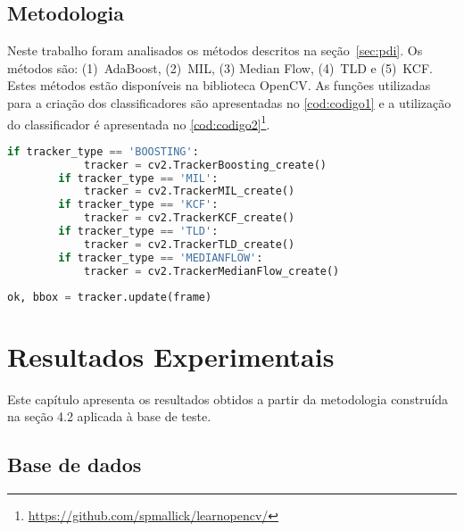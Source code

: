 \documentclass[12pt,oneside,a4paper,chapter=TITLE,section=TITLE,sumario=tradicional]{abntex2}
\begin{document}
\newpage

\section{Metodologia}

Neste trabalho foram analisados os métodos descritos na seção~\autoref{sec:pdi}. Os métodos são: (1)~AdaBoost, (2)~MIL, (3) Median Flow, (4)~TLD e (5)~KCF. Estes métodos estão disponíveis na biblioteca OpenCV. As funções utilizadas para a criação dos classificadores são apresentadas no \autoref{cod:codigo1} e a utilização do classificador é apresentada no \autoref{cod:codigo2}\footnote{\url{https://github.com/spmallick/learnopencv/}}.

\begin{codigo}[htb]
    \begin{lstlisting}[language=python]
        if tracker_type == 'BOOSTING':
            tracker = cv2.TrackerBoosting_create()
        if tracker_type == 'MIL':
            tracker = cv2.TrackerMIL_create()
        if tracker_type == 'KCF':
            tracker = cv2.TrackerKCF_create()
        if tracker_type == 'TLD':
            tracker = cv2.TrackerTLD_create()
        if tracker_type == 'MEDIANFLOW':
            tracker = cv2.TrackerMedianFlow_create()
    \end{lstlisting}
\end{codigo}

\begin{codigo}[htb]
    \begin{lstlisting}[language=python]
            ok, bbox = tracker.update(frame)
    \end{lstlisting}
\end{codigo}



\chapter{Resultados Experimentais}
\label{cap:resultados}

Este capítulo apresenta os resultados obtidos a partir da metodologia construída na seção 4.2 aplicada à base de teste.

\section{Base de dados}
\end{document}
